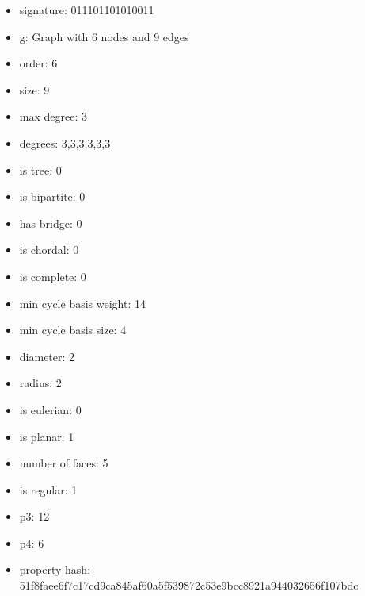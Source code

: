\begin{itemize}
\item signature: 011101101010011
\item g: Graph with 6 nodes and 9 edges
\item order: 6
\item size: 9
\item max degree: 3
\item degrees: 3,3,3,3,3,3
\item is tree: 0
\item is bipartite: 0
\item has bridge: 0
\item is chordal: 0
\item is complete: 0
\item min cycle basis weight: 14
\item min cycle basis size: 4
\item diameter: 2
\item radius: 2
\item is eulerian: 0
\item is planar: 1
\item number of faces: 5
\item is regular: 1
\item p3: 12
\item p4: 6
\item property hash: 51f8faee6f7c17cd9ca845af60a5f539872c53e9bcc8921a944032656f107bdc
\end{itemize}
\newpage
